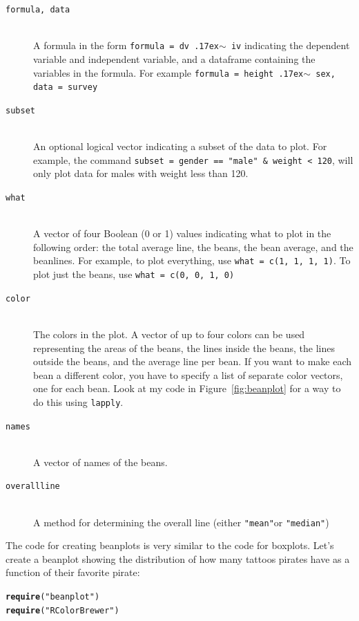 \documentclass{tufte-book}\usepackage[]{graphicx}\usepackage[]{color}
\makeatletter
\newcommand{\hlstr}[1]{\textcolor[rgb]{0.192,0.494,0.8}{#1}}%
\newcommand{\hlstd}[1]{\textcolor[rgb]{0.345,0.345,0.345}{#1}}%
\newcommand{\hlkwd}[1]{\textcolor[rgb]{0.737,0.353,0.396}{\textbf{#1}}}%
\newenvironment{kframe}{%
 \def\at@end@of@kframe{}%
 \ifinner\ifhmode%
  \def\at@end@of@kframe{\end{minipage}}%
  \begin{minipage}{\columnwidth}%
 \fi\fi%
 \def\FrameCommand##1{\hskip\@totalleftmargin \hskip-\fboxsep
 \colorbox{shadecolor}{##1}\hskip-\fboxsep
     \hskip-\linewidth \hskip-\@totalleftmargin \hskip\columnwidth}%
 \MakeFramed {\advance\hsize-\width
   \@totalleftmargin\z@ \linewidth\hsize
   \@setminipage}}%
 {\par\unskip\endMakeFramed%
 \at@end@of@kframe}
\newenvironment{knitrout}{}{} %
\makeatother
\begin{document}
\begin{footnotesize}
{{\begin{description}
  \item[\tt{formula, data}] \hfill \\
      A formula in the form \texttt{formula = dv {\raise.17ex\hbox{$\scriptstyle\sim$}} iv} indicating the dependent variable and independent variable, and a dataframe containing the variables in the formula. For example \texttt{formula = height {\raise.17ex\hbox{$\scriptstyle\sim$}} sex, data = survey}
        \item[\tt{subset}] \hfill \\
  An optional logical vector indicating a subset of the data to plot. For example, the command \texttt{subset = gender == "male" \& weight < 120}, will only plot data for males with weight less than 120.
         \item[\tt{what}] \hfill \\
A vector of four Boolean (0 or 1) values indicating what to plot in the following order: the total average line, the beans, the bean average, and the beanlines. For example, to plot everything, use \texttt{what = c(1, 1, 1, 1)}. To plot just the beans, use \texttt{what = c(0, 0, 1, 0)}
        \item[\tt{color}] \hfill \\
    The colors in the plot. A vector of up to four colors can be used representing the areas of the beans, the lines inside the beans, the lines outside the beans, and the average line per bean. If you want to make each bean a different color, you have to specify a list of separate color vectors, one for each bean. Look at my code in Figure~\ref{fig:beanplot} for a way to do this using \texttt{lapply}.
        \item[\tt{names}] \hfill \\
A vector of names of the beans.
\item[\tt{overallline}] \hfill \\
A method for determining the overall line (either \texttt{"mean"}or \texttt{"median"})
\end{description}

}
}
\vspace{5mm} %

The code for creating beanplots is very similar to the code for boxplots. Let's create a beanplot showing the distribution of how many tattoos pirates have as a function of their favorite pirate:

\begin{footnotesize}
\begin{knitrout}
\color{fgcolor}\begin{kframe}
\begin{alltt}
\hlkwd{require}\hlstd{(}\hlstr{"beanplot"}\hlstd{)}
\hlkwd{require}\hlstd{(}\hlstr{"RColorBrewer"}\hlstd{)}


\end{alltt}
\end{kframe}
\end{knitrout}
\end{footnotesize}
\end{footnotesize}
\end{document}
